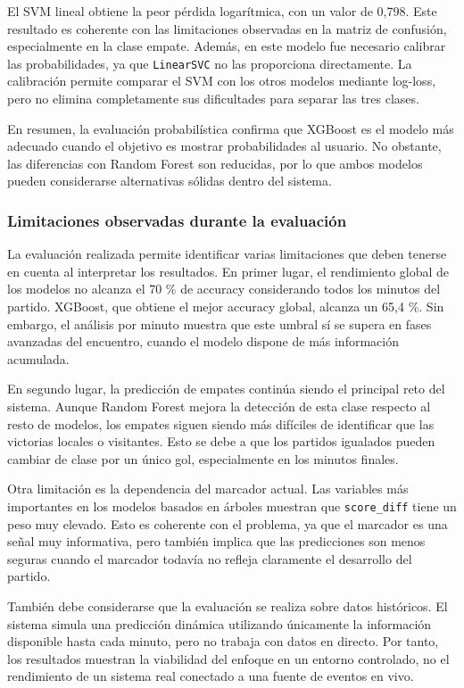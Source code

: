 El SVM lineal obtiene la peor pérdida logarítmica, con un valor de 0,798. Este resultado es coherente con las limitaciones observadas en la matriz de confusión, especialmente en la clase empate. Además, en este modelo fue necesario calibrar las probabilidades, ya que \texttt{LinearSVC} no las proporciona directamente. La calibración permite comparar el SVM con los otros modelos mediante log-loss, pero no elimina completamente sus dificultades para separar las tres clases.

En resumen, la evaluación probabilística confirma que XGBoost es el modelo más adecuado cuando el objetivo es mostrar probabilidades al usuario. No obstante, las diferencias con Random Forest son reducidas, por lo que ambos modelos pueden considerarse alternativas sólidas dentro del sistema.

\subsubsection*{Limitaciones observadas durante la evaluación}

La evaluación realizada permite identificar varias limitaciones que deben tenerse en cuenta al interpretar los resultados. En primer lugar, el rendimiento global de los modelos no alcanza el 70 \% de accuracy considerando todos los minutos del partido. XGBoost, que obtiene el mejor accuracy global, alcanza un 65,4 \%. Sin embargo, el análisis por minuto muestra que este umbral sí se supera en fases avanzadas del encuentro, cuando el modelo dispone de más información acumulada.

En segundo lugar, la predicción de empates continúa siendo el principal reto del sistema. Aunque Random Forest mejora la detección de esta clase respecto al resto de modelos, los empates siguen siendo más difíciles de identificar que las victorias locales o visitantes. Esto se debe a que los partidos igualados pueden cambiar de clase por un único gol, especialmente en los minutos finales.

Otra limitación es la dependencia del marcador actual. Las variables más importantes en los modelos basados en árboles muestran que \texttt{score\_diff} tiene un peso muy elevado. Esto es coherente con el problema, ya que el marcador es una señal muy informativa, pero también implica que las predicciones son menos seguras cuando el marcador todavía no refleja claramente el desarrollo del partido.

También debe considerarse que la evaluación se realiza sobre datos históricos. El sistema simula una predicción dinámica utilizando únicamente la información disponible hasta cada minuto, pero no trabaja con datos en directo. Por tanto, los resultados muestran la viabilidad del enfoque en un entorno controlado, no el rendimiento de un sistema real conectado a una fuente de eventos en vivo.

